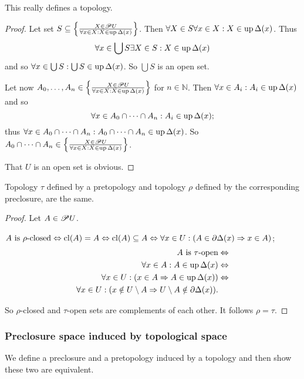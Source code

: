 \begin{prop}
This really defines a topology.\end{prop}
\begin{proof}
Let set $S\subseteq\left\{ \frac{X\in\mathscr{P} U}{\forall x\in X:X\in\operatorname{up}\Delta(x)}\right\}$.
Then $\forall X\in S\forall x\in X:X\in\operatorname{up}\Delta(x)$. Thus
\[
\forall x\in\bigcup S\exists X\in S:X\in\operatorname{up}\Delta(x)
\]
and so $\forall x\in\bigcup S:\bigcup S\in\operatorname{up}\Delta(x)$. So $\bigcup S$
is an open set.

Let now $A_{0},\dots,A_{n}\in\left\{ \frac{X\in\mathscr{P} U}{\forall x\in X:X\in\operatorname{up}\Delta(x)}\right\}$
for $n\in\mathbb{N}$. Then $\forall x\in A_{i}:A_{i}\in\operatorname{up}\Delta(x)$
and so
\[
\forall x\in A_{0}\cap\dots\cap A_{n}:A_{i}\in\operatorname{up}\Delta(x);
\]
thus $\forall x\in A_{0}\cap\dots\cap A_{n}:A_{0}\cap\dots\cap A_{n}\in\operatorname{up}\Delta(x)$.
So $A_{0}\cap\dots\cap A_{n}\in\left\{ \frac{X\in\mathscr{P} U}{\forall x\in X:X\in\operatorname{up}\Delta(x)}\right\}$.

That $U$ is an open set is obvious.\end{proof}
\begin{prop}
Topology $\tau$ defined by a pretopology and topology $\rho$ defined
by the corresponding preclosure, are the same.\end{prop}
\begin{proof}
Let $A\in\mathscr{P} U$.

$A\text{ is \ensuremath{\rho}-closed}\Leftrightarrow\operatorname{cl}(A)=A\Leftrightarrow\operatorname{cl}(A)\subseteq A\Leftrightarrow\forall x\in U:(A\in\partial\Delta(x)\Rightarrow x\in A)$;
\begin{align*}
A\text{ is \ensuremath{\tau}-open} & \Leftrightarrow\\
\forall x\in A:A\in\operatorname{up}\Delta(x) & \Leftrightarrow\\
\forall x\in U:(x\in A\Rightarrow A\in\operatorname{up}\Delta(x)) & \Leftrightarrow\\
\forall x\in U:(x\notin U\setminus A\Rightarrow U\setminus A\notin\partial\Delta(x)).
\end{align*}


So $\rho$-closed and $\tau$-open sets are complements of each other. It
follows $\rho=\tau$.
\end{proof}

\subsubsection{Preclosure space induced by topological space}

We define a preclosure
and a pretopology induced by a topology and then show these two are
equivalent.

